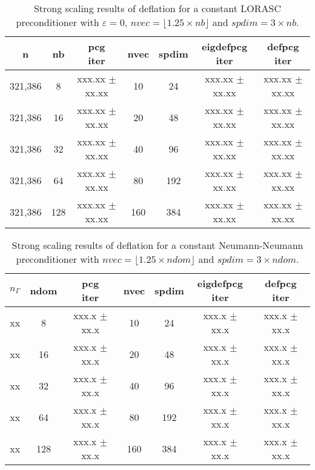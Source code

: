 \documentclass{article}
\begin{document}
\begin{table}[ht]
	\caption{Strong scaling results of deflation for a constant LORASC preconditioner with $\varepsilon=0$, $nvec=\lfloor1.25\times nb\rfloor$ and $spdim=3\times nb$.}
	\centering
	\begin{tabular}{|c|c|c|c|c|c|c|}
		\hline
		n & nb & \makecell{pcg\\ iter} & nvec & spdim & \makecell{eigdefpcg\\ iter} & \makecell{defpcg\\ iter}\\
		\hline
		321,386 &   8 & xxx.xx $\pm$ xx.xx &  10 &  24 & xxx.xx $\pm$ xx.xx & xxx.xx $\pm$ xx.xx \\
		321,386 &  16 & xxx.xx $\pm$ xx.xx &  20 &  48 & xxx.xx $\pm$ xx.xx & xxx.xx $\pm$ xx.xx \\
		321,386 &  32 & xxx.xx $\pm$ xx.xx &  40 &  96 & xxx.xx $\pm$ xx.xx & xxx.xx $\pm$ xx.xx \\
		321,386 &  64 & xxx.xx $\pm$ xx.xx &  80 & 192 & xxx.xx $\pm$ xx.xx & xxx.xx $\pm$ xx.xx \\
		321,386 & 128 & xxx.xx $\pm$ xx.xx & 160 & 384 & xxx.xx $\pm$ xx.xx & xxx.xx $\pm$ xx.xx \\
		\hline
	\end{tabular}
	\label{Tab:035}
\end{table}


\begin{table}[ht]
	\caption{Strong scaling results of deflation for a constant Neumann-Neumann preconditioner with $nvec=\lfloor1.25\times ndom\rfloor$ and $spdim=3\times ndom$.}
	\centering
	\begin{tabular}{|c|c|c|c|c|c|c|}
		\hline
		$n_\Gamma$ & ndom & \makecell{pcg\\ iter} & nvec & spdim & \makecell{eigdefpcg\\ iter} & \makecell{defpcg\\ iter}\\
		\hline
		xx  &   8 & xxx.x $\pm$  xx.x &  10 &  24 & xxx.x $\pm$ xx.x & xxx.x $\pm$ xx.x \\
		xx  &  16 & xxx.x $\pm$  xx.x &  20 &  48 & xxx.x $\pm$ xx.x & xxx.x $\pm$ xx.x \\
		xx  &  32 & xxx.x $\pm$  xx.x &  40 &  96 & xxx.x $\pm$ xx.x & xxx.x $\pm$ xx.x \\
		xx  &  64 & xxx.x $\pm$  xx.x &  80 & 192 & xxx.x $\pm$ xx.x & xxx.x $\pm$ xx.x \\
		xx  & 128 & xxx.x $\pm$  xx.x & 160 & 384 & xxx.x $\pm$ xx.x & xxx.x $\pm$ xx.x \\
		\hline
	\end{tabular}
	\label{Tab:040}
\end{table}
\end{document}

